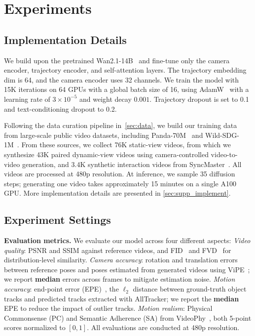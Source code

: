 \vspace{-2mm}
\section{Experiments}
\label{exp}


\subsection{Implementation Details}
We build upon the pretrained Wan2.1-14B~\cite{wan2025wan} and fine-tune only the camera encoder, trajectory encoder, and self-attention layers.
The trajectory embedding dim is 64, and the camera encoder uses 32 channels.
We train the model with 15K iterations on 64 GPUs with a global batch size of 16, using AdamW~\cite{loshchilov2017decoupled} with a learning rate of $3\times10^{-5}$ and weight decay $0.001$.
Trajectory dropout is set to 0.1 and text-conditioning dropout to 0.2.

Following the data curation pipeline in~\cref{sec:data}, we build our training data from large-scale public video datasets, including Panda-70M~\cite{chen2024panda} and Wild-SDG-1M~\cite{huang2025vipe}. From these sources, we collect 76K static-view videos, from which we synthesize 43K paired dynamic-view videos using camera-controlled video-to-video generation, and 3.4K synthetic interaction videos from SyncMaster~\cite{bai2024syncammaster}.
All videos are processed at 480p resolution.
At inference, we sample 35 diffusion steps; generating one video takes approximately 15 minutes on a single A100 GPU. More implementation details are presented in \cref{sec:supp_implement}.


\subsection{Experiment Settings}

\noindent\textbf{Evaluation metrics.}
We evaluate our model across four different aspects:
\emph{Video quality}: PSNR and SSIM against reference videos, and FID~\cite{FID} and FVD~\cite{FVD} for distribution-level similarity.
\emph{Camera accuracy}: rotation and translation errors~\cite{bai2025recammaster, bai2024syncammaster, cameractrl} between reference poses and poses estimated from generated videos using ViPE~\cite{huang2025vipe}; we report \textbf{median} errors across frames to mitigate estimation noise.
\emph{Motion accuracy}: end-point error (EPE)~\cite{chu2025wanmove, geng2024motionprompting}, the $\ell_2$ distance between ground-truth object tracks and predicted tracks extracted with AllTracker; we report the \textbf{median} EPE to reduce the impact of outlier tracks.
\emph{Motion realism}: Physical Commonsense (PC) and Semantic Adherence (SA) from VideoPhy~\cite{bansal2024videophy}, both 5-point scores normalized to $[0,1]$.
All evaluations are conducted at 480p resolution.


